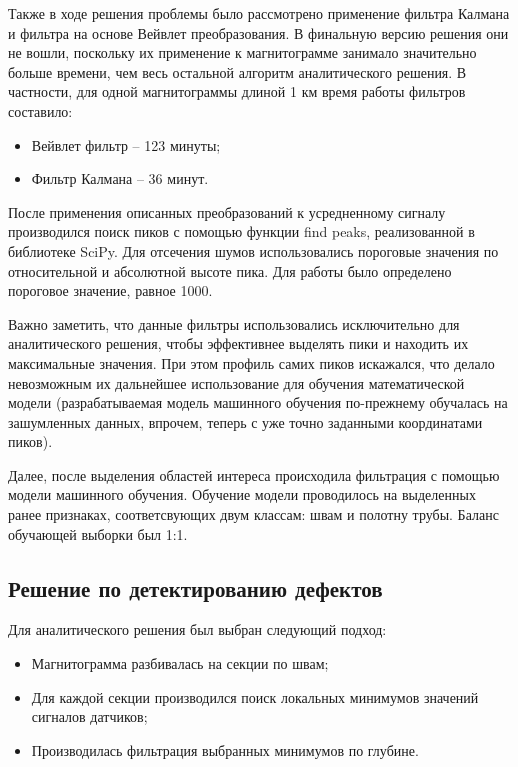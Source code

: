 \documentclass[a4paper,article,14pt]{extarticle}
\begin{document}
Также в ходе решения проблемы было рассмотрено применение фильтра Калмана и фильтра на основе Вейвлет преобразования. 
В финальную версию решения они не вошли, поскольку их применение к магнитограмме занимало значительно больше времени, 
чем весь остальной алгоритм аналитического решения. В частности, для одной магнитограммы длиной 1 км время работы 
фильтров составило:

\begin{itemize}
    \item Вейвлет фильтр – 123 минуты;
    \item Фильтр Калмана – 36 минут.
\end{itemize}

После применения описанных преобразований к усредненному сигналу производился поиск пиков с помощью функции 
find peaks, реализованной в библиотеке SciPy. Для отсечения шумов использовались пороговые значения 
по относительной и абсолютной высоте пика. Для работы было определено пороговое значение, равное 1000.

Важно заметить, что данные фильтры использовались исключительно для аналитического решения, чтобы эффективнее 
выделять пики и находить их максимальные значения. При этом профиль самих пиков искажался, что делало невозможным 
их дальнейшее использование для обучения математической модели (разрабатываемая модель машинного обучения по-прежнему 
обучалась на зашумленных данных, впрочем, теперь с уже точно заданными координатами пиков).

Далее, после выделения областей интереса происходила фильтрация с помощью модели машинного обучения. 
Обучение модели проводилось на выделенных ранее признаках, соответсвующих двум классам: швам и полотну трубы. 
Баланс обучающей выборки был 1:1. 

\subsection{Решение по детектированию дефектов}

Для аналитического решения был выбран следующий подход:

\begin{itemize}
    \item Магнитограмма разбивалась на секции по швам;
    \item Для каждой секции производился поиск локальных минимумов значений сигналов датчиков;
    \item Производилась фильтрация выбранных минимумов по глубине.
\end{itemize}
\end{document}
